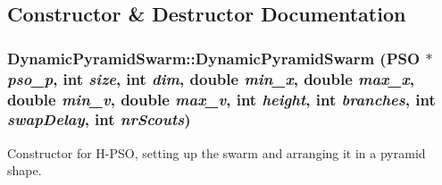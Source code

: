 \subsection{Constructor \& Destructor Documentation}
\hypertarget{classDynamicPyramidSwarm_53de8f13494e7080a5535a17baa2ae71}{
\subsubsection{\setlength{\rightskip}{0pt plus 5cm}DynamicPyramidSwarm::DynamicPyramidSwarm ({\bf PSO} $\ast$ {\em pso\_\-p}, \/  int {\em size}, \/  int {\em dim}, \/  double {\em min\_\-x}, \/  double {\em max\_\-x}, \/  double {\em min\_\-v}, \/  double {\em max\_\-v}, \/  int {\em height}, \/  int {\em branches}, \/  int {\em swapDelay}, \/  int {\em nrScouts})}}
\label{classDynamicPyramidSwarm_53de8f13494e7080a5535a17baa2ae71}


Constructor for H-PSO, setting up the swarm and arranging it in a pyramid shape. 

